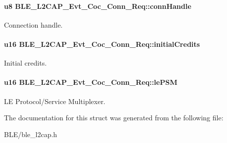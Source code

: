 \paragraph[{\texorpdfstring{conn\+Handle}{connHandle}}]{\setlength{\rightskip}{0pt plus 5cm}u8 B\+L\+E\+\_\+\+L2\+C\+A\+P\+\_\+\+Evt\+\_\+\+Coc\+\_\+\+Conn\+\_\+\+Req\+::conn\+Handle}\hypertarget{struct_b_l_e___l2_c_a_p___evt___coc___conn___req_a35247424e67ed594ad4a8bde4c911a9b}{}\label{struct_b_l_e___l2_c_a_p___evt___coc___conn___req_a35247424e67ed594ad4a8bde4c911a9b}
Connection handle. 
\paragraph[{\texorpdfstring{initial\+Credits}{initialCredits}}]{\setlength{\rightskip}{0pt plus 5cm}u16 B\+L\+E\+\_\+\+L2\+C\+A\+P\+\_\+\+Evt\+\_\+\+Coc\+\_\+\+Conn\+\_\+\+Req\+::initial\+Credits}\hypertarget{struct_b_l_e___l2_c_a_p___evt___coc___conn___req_a7044b7a6356cd161f03e7a4061e56ee5}{}\label{struct_b_l_e___l2_c_a_p___evt___coc___conn___req_a7044b7a6356cd161f03e7a4061e56ee5}
Initial credits. 
\paragraph[{\texorpdfstring{le\+P\+SM}{lePSM}}]{\setlength{\rightskip}{0pt plus 5cm}u16 B\+L\+E\+\_\+\+L2\+C\+A\+P\+\_\+\+Evt\+\_\+\+Coc\+\_\+\+Conn\+\_\+\+Req\+::le\+P\+SM}\hypertarget{struct_b_l_e___l2_c_a_p___evt___coc___conn___req_a26b101efbd85d92e11e3fb77aa52baf3}{}\label{struct_b_l_e___l2_c_a_p___evt___coc___conn___req_a26b101efbd85d92e11e3fb77aa52baf3}
LE Protocol/\+Service Multiplexer. 

The documentation for this struct was generated from the following file\+:\begin{DoxyCompactItemize}
\item 
B\+L\+E/ble\+\_\+l2cap.\+h\end{DoxyCompactItemize}
